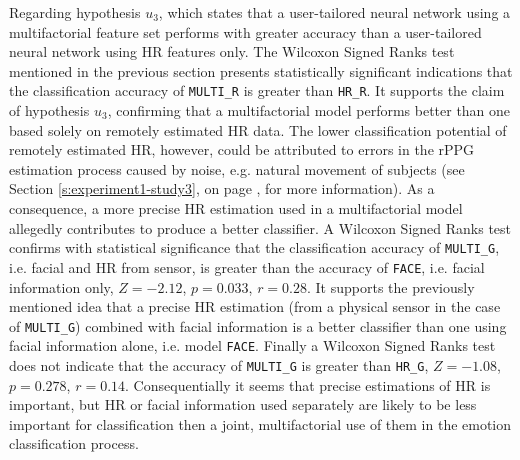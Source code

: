 Regarding hypothesis $u_3$, which states that a user-tailored neural network using a multifactorial feature set performs with greater accuracy than a user-tailored neural network using HR features only. The Wilcoxon Signed Ranks test mentioned in the previous section presents statistically significant indications that the classification accuracy of \texttt{MULTI\_R} is greater than \texttt{HR\_R}. It supports the claim of hypothesis $u_3$, confirming that a multifactorial model performs better than one based solely on remotely estimated HR data. The lower classification potential of remotely estimated HR, however, could be attributed to errors in the rPPG estimation process caused by noise, e.g. natural movement of subjects (see Section \ref{s:experiment1-study3}, on page \pageref{s:experiment1-study3}, for more information). As a consequence, a more precise HR estimation used in a multifactorial model allegedly contributes to produce a better classifier. A Wilcoxon Signed Ranks test confirms with statistical significance that the classification accuracy of \texttt{MULTI\_G}, i.e. facial and HR from sensor, is greater than the accuracy of \texttt{FACE}, i.e. facial information only, $Z=-2.12$, $p=0.033$, $r=0.28$. It supports the previously mentioned idea that a precise HR estimation (from a physical sensor in the case of \texttt{MULTI\_G}) combined with facial information is a better classifier than one using facial information alone, i.e. model \texttt{FACE}. Finally a Wilcoxon Signed Ranks test does not indicate that the accuracy of \texttt{MULTI\_G} is greater than \texttt{HR\_G}, $Z=-1.08$, $p=0.278$, $r=0.14$. Consequentially it seems that precise estimations of HR is important, but HR or facial information used separately are likely to be less important for classification then a joint, multifactorial use of them in the emotion classification process.

